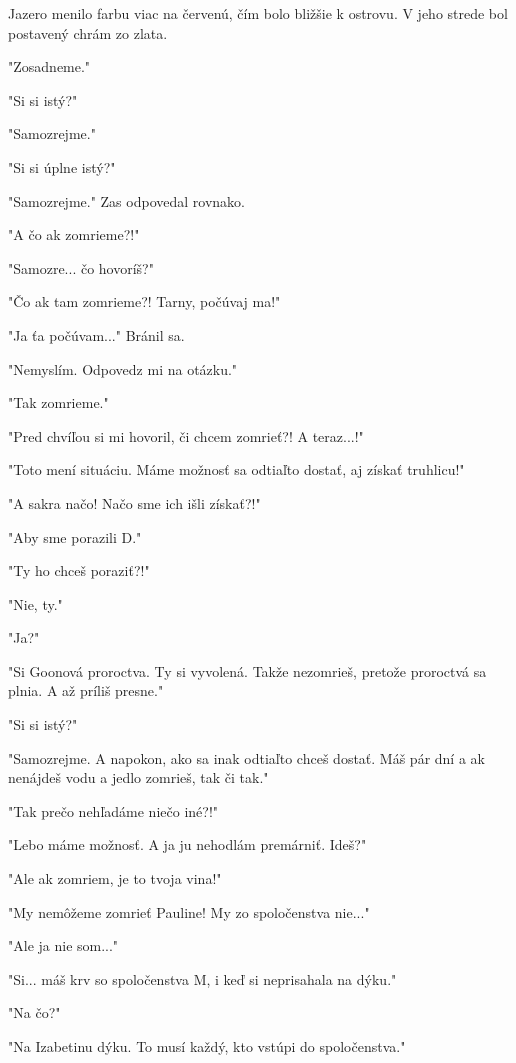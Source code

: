 \documentclass{book}
\begin{document}
Jazero menilo farbu viac na červenú, čím bolo bližšie k ostrovu. V jeho strede bol postavený chrám zo zlata.

"$ $Zosadneme."$ $ 

"$ $Si si istý?"$ $ 

"$ $Samozrejme."$ $ 

"$ $Si si úplne istý?"$ $ 

"$ $Samozrejme."$ $  Zas odpovedal rovnako.

"$ $A čo ak zomrieme?!"$ $ 

"$ $Samozre... čo hovoríš?"$ $ 

"$ $Čo ak tam zomrieme?! Tarny, počúvaj ma!"$ $ 

"$ $Ja ťa počúvam..."$ $  Bránil sa.

"$ $Nemyslím. Odpovedz mi na otázku."$ $ 

"$ $Tak zomrieme."$ $ 

"$ $Pred chvíľou si mi hovoril, či chcem zomrieť?! A teraz...!"$ $ 

"$ $Toto mení situáciu. Máme možnosť sa odtiaľto dostať, aj získať truhlicu!"$ $ 

"$ $A sakra načo! Načo sme ich išli získať?!"$ $ 

"$ $Aby sme porazili D."$ $ 

"$ $Ty ho chceš poraziť?!"$ $ 

"$ $Nie, ty."$ $ 

"$ $Ja?"$ $ 

"$ $Si Goonová proroctva. Ty si vyvolená. Takže nezomrieš, pretože proroctvá sa plnia. A až príliš presne."$ $ 

"$ $Si si istý?"$ $ 

"$ $Samozrejme. A napokon, ako sa inak odtiaľto chceš dostať. Máš pár dní a ak nenájdeš vodu a jedlo zomrieš, tak či tak."$ $ 

"$ $Tak prečo nehľadáme niečo iné?!"$ $ 

"$ $Lebo máme možnosť. A ja ju nehodlám premárniť. Ideš?"$ $ 

"$ $Ale ak zomriem, je to tvoja vina!"$ $ 

"$ $My nemôžeme zomrieť Pauline! My zo spoločenstva nie..."$ $ 

"$ $Ale ja nie som..."$ $ 

"$ $Si... máš krv so spoločenstva M, i keď si neprisahala na dýku."$ $ 

"$ $Na čo?"$ $ 

"$ $Na Izabetinu dýku. To musí každý, kto vstúpi do spoločenstva."$ $  
\end{document}
